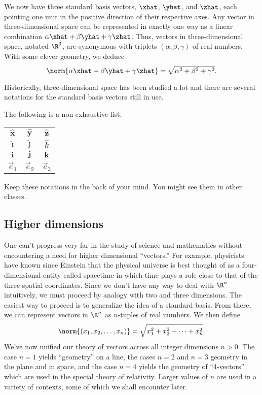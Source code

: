 We now have three standard basis vectors, $\xhat$, $\yhat$,
and $\zhat$, each pointing one unit in the positive direction of their
respective axes.
Any vector in three-dimensional
space can be represented
in exactly one way
as a linear combination $\alpha\xhat+\beta\yhat+\gamma\zhat$.  Thus,
vectors in three-dimensional space, notated $\R^3$,
are synonymous with triplets $(\alpha,\beta,\gamma)$
of real numbers.  With some clever geometry, we deduce
\[
	\norm{\alpha\xhat+\beta\yhat+\gamma\zhat}=\sqrt{\alpha^2+\beta^2+\gamma^2}.
\]

Historically, three-dimensional space has been studied a lot and there
are several notations for the standard basis vectors still in use.

The following is a non-exhaustive list.
\begin{center}
	\begin{tabular}{c  c  c}
		$\hat{\mathbf{x}}$ & $\hat{\mathbf{y}}$ &$\hat{\mathbf{z}}$\\
		$\hat{\imath}$ & $\hat{\jmath}$ &$\hat{k}$\\
		$\mathbf{i}$ & $\mathbf j$ & $\mathbf k$\\
		$\vec e_1$ & $\vec e_2$ & $\vec e_3$
	\end{tabular}
\end{center}
Keep these notations in the back of your mind.  You might see them in other classes.

\subsection{Higher dimensions}
One can't progress very far in the study of science and mathematics
without encountering a need for higher dimensional ``vectors.''  For
example, physicists have known since Einstein that the physical
universe is best thought of as a four-dimensional entity called
spacetime in which time plays a role close to that of the
three spatial coordinates.  Since we don't have any way to deal with
$\R^n$
intuitively, we must
proceed by analogy with two and three dimensions.
The easiest
way to proceed is to generalize the idea of a standard basis.
From there, we can represent vectors in $\R^n$ as $n$-tuples of real numbers.
We then define
\[
	\norm{(x_1,x_2,\ldots,x_n)} = \sqrt{x_1^2+x_2^2+\cdots+x_n^2}.
\]
We've now unified our theory of vectors across all integer dimensions $n>0$.
The case $n=1$ yields  ``geometry'' on a line,
the cases $n = 2$ and $n = 3$ geometry in the plane and in space, and
the case $n = 4$ yields the geometry of ``4-vectors'' which
are  used in the special theory of relativity.
Larger values of $n$ are used in a
variety of contexts, some of which we shall encounter later.

